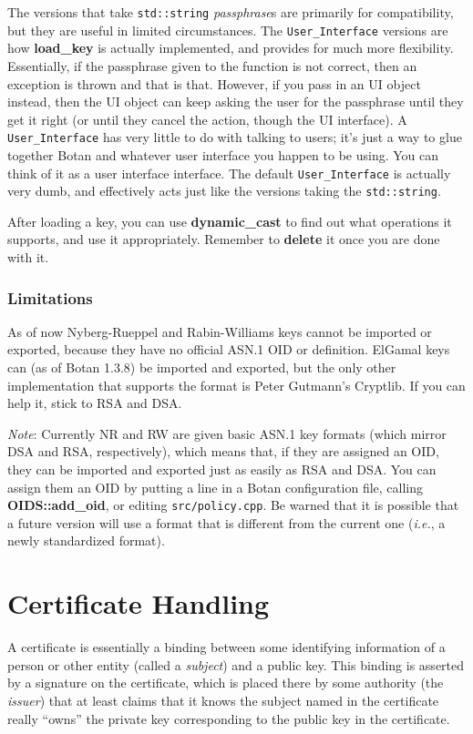 \documentclass{article}
\newcommand{\filename}[1]{\texttt{#1}}
\newcommand{\function}[1]{\textbf{#1}}
\newcommand{\type}[1]{\texttt{#1}}
\renewcommand{\arg}[1]{\textsl{#1}}
\newcommand{\ie}[0]{\emph{i.e.}}
\begin{document}
The versions that take \type{std::string} \arg{passphrase}s are primarily for
compatibility, but they are useful in limited circumstances. The
\type{User\_Interface} versions are how \function{load\_key} is actually
implemented, and provides for much more flexibility. Essentially, if the
passphrase given to the function is not correct, then an exception is thrown
and that is that. However, if you pass in an UI object instead, then the UI
object can keep asking the user for the passphrase until they get it right (or
until they cancel the action, though the UI interface). A
\type{User\_Interface} has very little to do with talking to users; it's just a
way to glue together Botan and whatever user interface you happen to be
using. You can think of it as a user interface interface. The default
\type{User\_Interface} is actually very dumb, and effectively acts just like
the versions taking the \type{std::string}.

After loading a key, you can use \function{dynamic\_cast} to find out what
operations it supports, and use it appropriately. Remember to \function{delete}
it once you are done with it.

\subsubsection{Limitations}

As of now Nyberg-Rueppel and Rabin-Williams keys cannot be imported or
exported, because they have no official ASN.1 OID or definition. ElGamal keys
can (as of Botan 1.3.8) be imported and exported, but the only other
implementation that supports the format is Peter Gutmann's Cryptlib. If you
can help it, stick to RSA and DSA.

\emph{Note}: Currently NR and RW are given basic ASN.1 key formats (which
mirror DSA and RSA, respectively), which means that, if they are assigned an
OID, they can be imported and exported just as easily as RSA and DSA. You can
assign them an OID by putting a line in a Botan configuration file, calling
\function{OIDS::add\_oid}, or editing \filename{src/policy.cpp}. Be warned that
it is possible that a future version will use a format that is different from
the current one (\ie, a newly standardized format).

\pagebreak
\section{Certificate Handling}

A certificate is essentially a binding between some identifying information of
a person or other entity (called a \emph{subject}) and a public key. This
binding is asserted by a signature on the certificate, which is placed there by
some authority (the \emph{issuer}) that at least claims that it knows the
subject named in the certificate really ``owns'' the private key
corresponding to the public key in the certificate.
\end{document}
